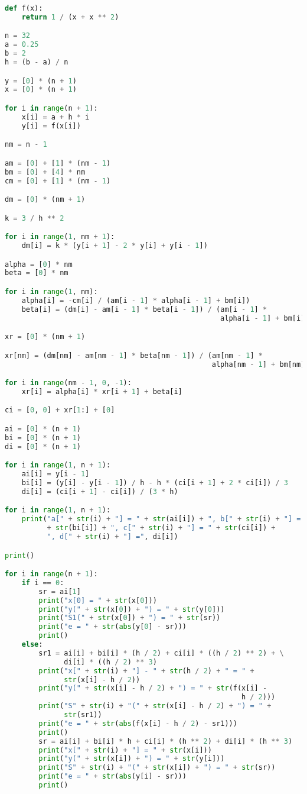 \documentclass [12pt]{article}
\begin{document}
\begin{lstlisting}[language=python]
def f(x):
    return 1 / (x + x ** 2)

n = 32
a = 0.25
b = 2
h = (b - a) / n

y = [0] * (n + 1)
x = [0] * (n + 1)

for i in range(n + 1):
    x[i] = a + h * i
    y[i] = f(x[i])

nm = n - 1

am = [0] + [1] * (nm - 1)
bm = [0] + [4] * nm
cm = [0] + [1] * (nm - 1)

dm = [0] * (nm + 1)

k = 3 / h ** 2

for i in range(1, nm + 1):
    dm[i] = k * (y[i + 1] - 2 * y[i] + y[i - 1])

alpha = [0] * nm
beta = [0] * nm

for i in range(1, nm):
    alpha[i] = -cm[i] / (am[i - 1] * alpha[i - 1] + bm[i])
    beta[i] = (dm[i] - am[i - 1] * beta[i - 1]) / (am[i - 1] *
                                                   alpha[i - 1] + bm[i])

xr = [0] * (nm + 1)

xr[nm] = (dm[nm] - am[nm - 1] * beta[nm - 1]) / (am[nm - 1] *
                                                 alpha[nm - 1] + bm[nm])

for i in range(nm - 1, 0, -1):
    xr[i] = alpha[i] * xr[i + 1] + beta[i]

ci = [0, 0] + xr[1:] + [0]

ai = [0] * (n + 1)
bi = [0] * (n + 1)
di = [0] * (n + 1)

for i in range(1, n + 1):
    ai[i] = y[i - 1]
    bi[i] = (y[i] - y[i - 1]) / h - h * (ci[i + 1] + 2 * ci[i]) / 3
    di[i] = (ci[i + 1] - ci[i]) / (3 * h)

for i in range(1, n + 1):
    print("a[" + str(i) + "] = " + str(ai[i]) + ", b[" + str(i) + "] = "
          + str(bi[i]) + ", c[" + str(i) + "] = " + str(ci[i]) +
          ", d[" + str(i) + "] =", di[i])

print()

for i in range(n + 1):
    if i == 0:
        sr = ai[1]
        print("x[0] = " + str(x[0]))
        print("y(" + str(x[0]) + ") = " + str(y[0]))
        print("S1(" + str(x[0]) + ") = " + str(sr))
        print("e = " + str(abs(y[0] - sr)))
        print()
    else:
        sr1 = ai[i] + bi[i] * (h / 2) + ci[i] * ((h / 2) ** 2) + \
              di[i] * ((h / 2) ** 3)
        print("x[" + str(i) + "] - " + str(h / 2) + " = " +
              str(x[i] - h / 2))
        print("y(" + str(x[i] - h / 2) + ") = " + str(f(x[i] -
                                                        h / 2)))
        print("S" + str(i) + "(" + str(x[i] - h / 2) + ") = " +
              str(sr1))
        print("e = " + str(abs(f(x[i] - h / 2) - sr1)))
        print()
        sr = ai[i] + bi[i] * h + ci[i] * (h ** 2) + di[i] * (h ** 3)
        print("x[" + str(i) + "] = " + str(x[i]))
        print("y(" + str(x[i]) + ") = " + str(y[i]))
        print("S" + str(i) + "(" + str(x[i]) + ") = " + str(sr))
        print("e = " + str(abs(y[i] - sr)))
        print()


\end{lstlisting}
\end{document}
